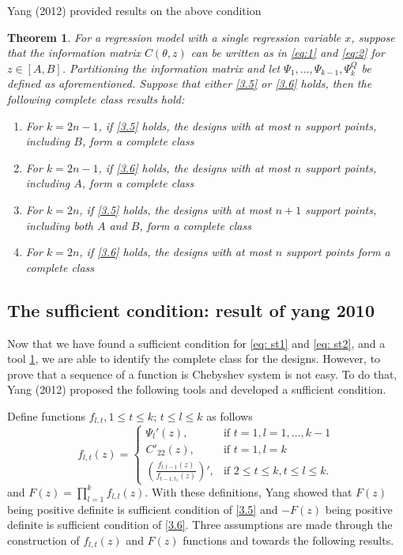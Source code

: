 \documentclass[11pt]{amsart}
\newtheorem{theorem}{Theorem}[section]
\theoremstyle{definition}
\theoremstyle{remark}
\begin{document}
Yang (2012) provided results on the above condition
\begin{theorem}\label{2012a}
For a regression model with a single regression variable $x$, suppose that the information matrix $C(\theta,z)$ can be written as in \eqref{eq:1} and \eqref{eq:2} for $z\in[A,B]$. Partitioning the information matrix and let $\Psi_1,\ldots,\Psi_{k-1},\Psi^Q_{k}$ be defined as aforementioned. Suppose that either \ref{3.5} or \ref{3.6} holds, then the following complete class results hold:
\begin{enumerate}
    \item [(a)] For $k=2n-1$, if \ref{3.5} holds, the designs with at most $n$ support points, including $B$, form a complete class
    
      \item [(b)] For $k=2n-1$, if \ref{3.6} holds, the designs with at most $n$ support points, including $A$, form a complete class
      \item [(c)] For $k=2n$, if \ref{3.5} holds, the designs with at most $n+1$ support points, including both $A$ and $B$, form a complete class
      \item [(d)] For $k=2n$, if \ref{3.6} holds, the designs with at most $n$ support points form a complete class
    
\end{enumerate}
\end{theorem}

\subsection{The sufficient condition: result of yang 2010}
Now that we have found a sufficient condition for \eqref{eq: st1} and  \eqref{eq: st2}, and a tool \ref{2012a}, we are able to identify the complete class for the designs. However, to prove that a sequence of a function is Chebyshev system is not easy. To do that, Yang (2012) proposed the following tools and developed a sufficient condition.

 Define functions $f_{l,t}, 1\le t \le k$; $t\le l \le k$ as follows
\begin{equation}\label{eq: ff}
f_{l,t}(z) = \left \{ \begin{array}{ll}
\Psi_l'(z), & \text{if } t=1,l=1,...,k-1\\
C'_{22}(z), & \text{if } t=1,l=k\\
(\frac{f_{l,t-1}(z)}{f_{t-1,t_1}(z)})', & \text{if } 2\le t\le k, t\le l \le k.
\end{array}\right.
\end{equation}
and   $F(z) = \prod_{l=1}^k f_{l,l}(z)$. With these definitions, Yang showed that $F(z)$ being positive definite is sufficient condition of \ref{3.5} and  $-F(z)$ being positive definite is sufficient condition of \ref{3.6}. Three assumptions are made through the construction of $f_{l,t}(z)$ and $F(z)$ functions and towards the following results. 
\end{document}
